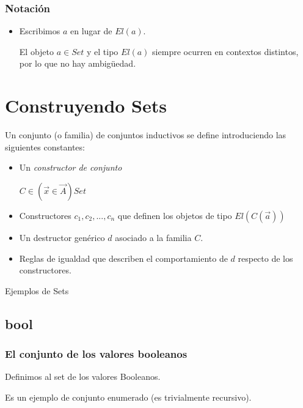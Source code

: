 \documentclass{beamer}
\begin{document}
\begin{frame}\frametitle{Notaci\'on}
  \pause
  \begin{itemize}
  \item
    Escribimos $a$ en lugar de $El(a)$.
    \pause

    El objeto $a \in Set$ y el tipo $El(a)$ siempre ocurren en contextos
    distintos, por lo que no hay ambig\"uedad.
    
  \end{itemize}
\end{frame}



\section{Construyendo Sets}


\begin{frame}
  Un conjunto (o familia) de conjuntos inductivos se define introduciendo
  las siguientes constantes:

  \pause
  \begin{itemize}
  \item
    Un \emph{constructor de conjunto}
    \begin{center}
      $C \in (\vec{x} \in \vec{A})Set$
    \end{center}
    
    \pause
  \item
    Constructores $c_1, c_2, ..., c_n$ que definen los objetos de
    tipo $El(C(\vec{a}))$
    
    \pause
  \item
    Un destructor gen\'erico $d$ asociado a la familia $C$.
    \pause

  \item
    Reglas de igualdad que describen el comportamiento de $d$ respecto de los
    constructores.
    
  \end{itemize}  
\end{frame}

\begin{frame}
  Ejemplos de Sets
\end{frame}

\subsection{bool}
\begin{frame}\frametitle{El conjunto de los valores booleanos}
  Definimos al set de los valores Booleanos.
  \pause

  Es un ejemplo de conjunto enumerado (es trivialmente recursivo).
  \pause
\end{frame}
\end{document}
